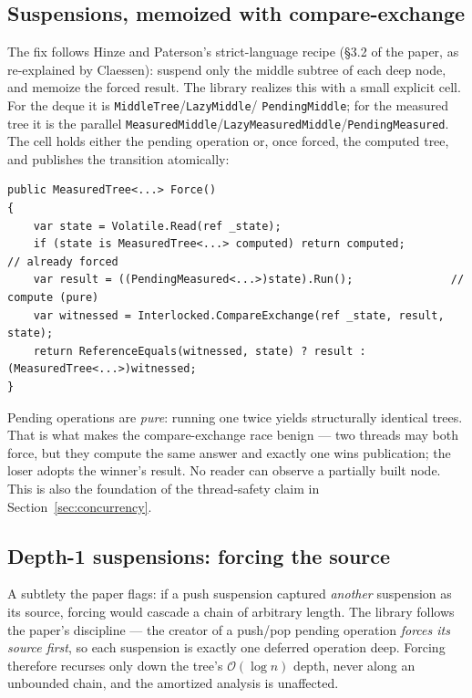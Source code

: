 \documentclass[11pt]{article}
\newcommand{\cs}[1]{\lstinline|#1|}
\newcommand{\bigO}{\ensuremath{\mathcal{O}}}
\begin{document}
\subsection{Suspensions, memoized with compare-exchange}

The fix follows Hinze and Paterson's strict-language recipe (\S3.2 of the paper, as re-explained by
Claessen): suspend only the middle subtree of each deep node, and memoize the forced result. The library
realizes this with a small explicit cell. For the deque it is \cs{MiddleTree}/\cs{LazyMiddle}/
\cs{PendingMiddle}; for the measured tree it is the parallel
\cs{MeasuredMiddle}/\cs{LazyMeasuredMiddle}/\cs{PendingMeasured}. The cell holds either the pending
operation or, once forced, the computed tree, and publishes the transition atomically:

\begin{lstlisting}
public MeasuredTree<...> Force()
{
    var state = Volatile.Read(ref _state);
    if (state is MeasuredTree<...> computed) return computed;        // already forced
    var result = ((PendingMeasured<...>)state).Run();               // compute (pure)
    var witnessed = Interlocked.CompareExchange(ref _state, result, state);
    return ReferenceEquals(witnessed, state) ? result : (MeasuredTree<...>)witnessed;
}
\end{lstlisting}

Pending operations are \emph{pure}: running one twice yields structurally identical trees. That is what
makes the compare-exchange race benign --- two threads may both force, but they compute the same answer
and exactly one wins publication; the loser adopts the winner's result. No reader can observe a
partially built node. This is also the foundation of the thread-safety claim in
Section~\ref{sec:concurrency}.

\subsection{Depth-1 suspensions: forcing the source}

A subtlety the paper flags: if a push suspension captured \emph{another} suspension as its source, forcing
would cascade a chain of arbitrary length. The library follows the paper's discipline --- the creator of
a push/pop pending operation \emph{forces its source first}, so each suspension is exactly one deferred
operation deep. Forcing therefore recurses only down the tree's $\bigO(\log n)$ depth, never along an
unbounded chain, and the amortized analysis is unaffected.
\end{document}
